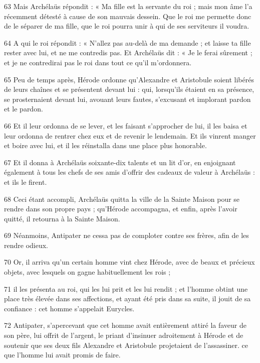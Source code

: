 \par 63 Mais Archélaüs répondit : « Ma fille est la servante du roi ; mais mon âme l'a récemment détesté à cause de son mauvais dessein. Que le roi me permette donc de le séparer de ma fille, que le roi pourra unir à qui de ses serviteurs il voudra.

\par 64 A qui le roi répondit : « N'allez pas au-delà de ma demande ; et laisse ta fille rester avec lui, et ne me contredis pas. Et Archélaüs dit : « Je le ferai sûrement ; et je ne contredirai pas le roi dans tout ce qu’il m’ordonnera.

\par 65 Peu de temps après, Hérode ordonne qu'Alexandre et Aristobule soient libérés de leurs chaînes et se présentent devant lui : qui, lorsqu'ils étaient en sa présence, se prosternaient devant lui, avouant leurs fautes, s'excusant et implorant pardon et le pardon.

\par 66 Et il leur ordonna de se lever, et les faisant s'approcher de lui, il les baisa et leur ordonna de rentrer chez eux et de revenir le lendemain. Et ils vinrent manger et boire avec lui, et il les réinstalla dans une place plus honorable.

\par 67 Et il donna à Archélaüs soixante-dix talents et un lit d'or, en enjoignant également à tous les chefs de ses amis d'offrir des cadeaux de valeur à Archélaüs : et ils le firent.

\par 68 Ceci étant accompli, Archélaüs quitta la ville de la Sainte Maison pour se rendre dans son propre pays ; qu'Hérode accompagna, et enfin, après l'avoir quitté, il retourna à la Sainte Maison.

\par 69 Néanmoins, Antipater ne cessa pas de comploter contre ses frères, afin de les rendre odieux.

\par 70 Or, il arriva qu'un certain homme vint chez Hérode, avec de beaux et précieux objets, avec lesquels on gagne habituellement les rois ;

\par 71 il les présenta au roi, qui les lui prit et les lui rendit ; et l'homme obtint une place très élevée dans ses affections, et ayant été pris dans sa suite, il jouit de sa confiance : cet homme s'appelait Eurycles.

\par 72 Antipater, s'apercevant que cet homme avait entièrement attiré la faveur de son père, lui offrit de l'argent, le priant d'insinuer adroitement à Hérode et de soutenir que ses deux fils Alexandre et Aristobule projetaient de l'assassiner. ce que l'homme lui avait promis de faire.

